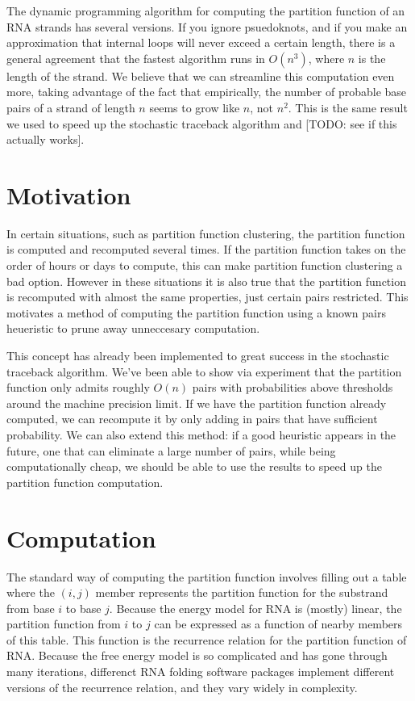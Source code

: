 The dynamic programming algorithm for computing the partition function
of an RNA strands has several versions. If you ignore psuedoknots, and
if you make an approximation that internal loops will never exceed a
certain length, there is a general agreement that the fastest
algorithm runs in $O(n^3)$, where $n$ is the length of the strand. We
believe that we can streamline this computation even more, taking
advantage of the fact that empirically, the number of probable base
pairs of a strand of length $n$ seems to grow like $n$, not
$n^2$. This is the same result we used to speed up the stochastic
traceback algorithm and [TODO: see if this actually works].

\section{Motivation}

In certain situations, such as partition function clustering, the
partition function is computed and recomputed several times. If the
partition function takes on the order of hours or days to compute,
this can make partition function clustering a bad option. However in
these situations it is also true that the partition function is
recomputed with almost the same properties, just certain pairs
restricted. This motivates a method of computing the partition
function using a known pairs heueristic to prune away unneccesary
computation.

This concept has already been implemented to great success in the
stochastic traceback algorithm. We've been able to show via experiment
that the partition function only admits roughly $O(n)$ pairs with
probabilities above thresholds around the machine precision limit. If
we have the partition function already computed, we can recompute it
by only adding in pairs that have sufficient probability. We can also
extend this method: if a good heuristic appears in the future, one
that can eliminate a large number of pairs, while being
computationally cheap, we should be able to use the results to speed
up the partition function computation.

\section{Computation}

The standard way of computing the partition function involves filling
out a table where the $(i,j)$ member represents the partition function
for the substrand from base $i$ to base $j$. Because the energy model
for RNA is (mostly) linear, the partition function from $i$ to $j$ can
be expressed as a function of nearby members of this table. This
function is the recurrence relation for the partition function of
RNA. Because the free energy model is so complicated and has gone
through many iterations, differenct RNA folding software packages
implement different versions of the recurrence relation, and they vary
widely in complexity.

